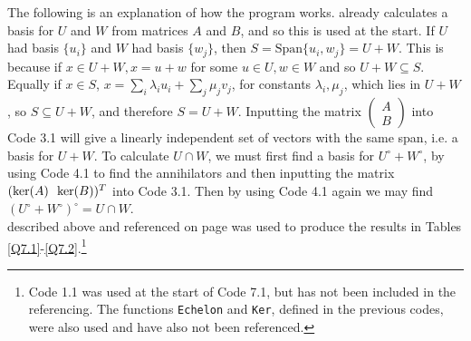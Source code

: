 \documentclass[10pt,a4paper,notitlepage]{article}
\newcommand{\Span}{\text{Span}}
\begin{document}
The following is an explanation of how the program works.  already calculates a basis for $U$ and $W$ from matrices $A$ and $B$, and so this is used at the start. If $U$ had basis $\{u_{i}\}$ and $W$ had basis $\{w_{j}\}$, then $S=\Span\{u_{i},w_{j}\}=U+W$. 
This is because if $x\in U+W,  x=u+w$ for some $u\in U,w\in W$ and so $U+W\subseteq S$.  Equally if $x\in S$, $x=\sum_{i} \lambda_{i}u_{i}+\sum_{j}\mu_{j}v_{j}$, for constants $\lambda_{i},\mu_{j}$, which lies in $U+W$, so $S\subseteq U+W$, and therefore $S=U+W$. Inputting the matrix 
$\begin{pmatrix}
A\\B
\end{pmatrix}$
into Code 3.1 will give a linearly independent set of vectors with the same span, i.e. a basis for $U+W$. 
To calculate $U\cap W$, we must first find a basis for $U^{\circ}+W^{\circ}$, by using Code 4.1 to find the annihilators and then inputting the matrix $(\ker(A)\hspace{0.5em}\ker(B))^{T}$ into Code 3.1. Then by using Code 4.1 again we may find $(U^{\circ}+W^{\circ})^{\circ}=U\cap W$.\\



 described above and referenced on page \pageref{subsec:Code 7.1} was used to produce the results in Tables \ref{Q7.1}-\ref{Q7.2}.\footnote{Code 1.1 was used at the start of Code 7.1, but has not been included in the referencing. The functions \texttt{Echelon} and \texttt{Ker}, defined in the previous codes, were also used and have also not been referenced.}
\end{document}
